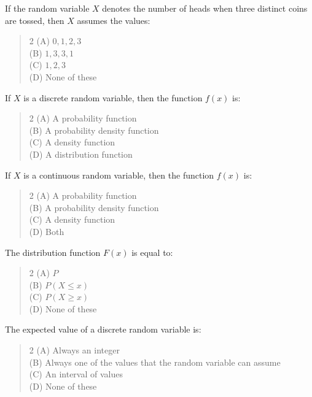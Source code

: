 \documentclass[11pt,a4paper]{article}
\begin{document}
\begin{mcqlist}
\item If the random variable $X$ denotes the number of heads when three distinct coins are tossed, then $X$ assumes the values:
\begin{quote}\begin{multicols}{2}
\noindent (A) $0,1,2,3$ \\
(B) $1,3,3,1$ \\
(C) $1,2,3$ \\
(D) None of these
\end{multicols}\end{quote}

\item If $X$ is a discrete random variable, then the function $f(x)$ is:
\begin{quote}\begin{multicols}{2}
\noindent (A) A probability function \\
(B) A probability density function \\
(C) A density function \\
(D) A distribution function
\end{multicols}\end{quote}

\item If $X$ is a continuous random variable, then the function $f(x)$ is:
\begin{quote}\begin{multicols}{2}
\noindent (A) A probability function \\
(B) A probability density function \\
(C) A density function \\
(D) Both
\end{multicols}\end{quote}

\item The distribution function $F(x)$ is equal to:
\begin{quote}\begin{multicols}{2}
\noindent (A) $P$ \\
(B) $P(X\leq x)$ \\
(C) $P(X\geq x)$ \\
(D) None of these
\end{multicols}\end{quote}

\item The expected value of a discrete random variable is:
\begin{quote}\begin{multicols}{2}
\noindent (A) Always an integer \\
(B) Always one of the values that the random variable can assume \\
(C) An interval of values \\
(D) None of these
\end{multicols}\end{quote}


\end{mcqlist}
\end{document}
